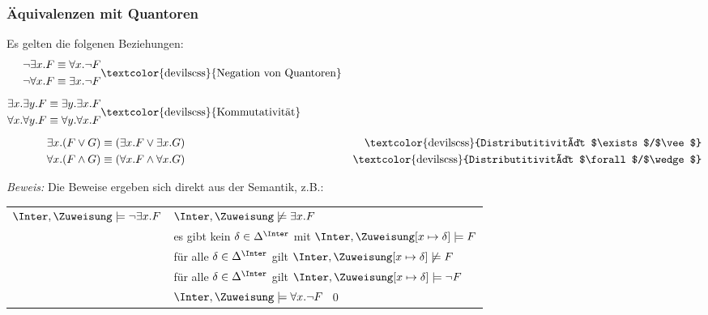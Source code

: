 \documentclass[aspectratio=1610,onlymath]{beamer}
\begin{document}
\begin{frame}\frametitle{Äquivalenzen mit Quantoren}

Es gelten die folgenen Beziehungen:
\begin{align*}
\begin{split}
\neg\exists x.F &\equiv \forall x.\neg F\\
\neg\forall x.F &\equiv \exists x.\neg F
\end{split}
& \text{\textcolor{devilscss}{Negation von Quantoren}}\\[1ex]
%
\begin{split}
\exists x.\exists y.F &\equiv \exists y.\exists x.F\\
\forall x.\forall y.F &\equiv \forall y.\forall x.F
\end{split}
& \text{\textcolor{devilscss}{Kommutativität}}\\[1ex]
%
\exists x.(F\vee G) &\equiv (\exists x.F\vee \exists x.G) & \text{\textcolor{devilscss}{Distributitivität $\exists$/$\vee$}}\\
\forall x.(F\wedge G) &\equiv (\forall x.F\wedge \forall x.G) & \text{\textcolor{devilscss}{Distributitivität $\forall$/$\wedge$}}
\end{align*}

\pause\emph{Beweis:} Die Beweise ergeben sich direkt aus der Semantik, z.B.:\bigskip

\begin{tabular}{r@{ gdw. }l}
$\Inter,\Zuweisung\models \neg\exists x.F$
& $\Inter,\Zuweisung\not\models \exists x.F$\pause\\[-0.9ex]
& es gibt kein $\delta\in\Delta^\Inter$ mit $\Inter,\Zuweisung[x\mapsto\delta]\models F$\pause\\[-0.9ex]
& für alle $\delta\in\Delta^\Inter$ gilt $\Inter,\Zuweisung[x\mapsto\delta]\not\models F$\pause\\[-0.9ex]
& für alle $\delta\in\Delta^\Inter$ gilt $\Inter,\Zuweisung[x\mapsto\delta]\models \neg F$\pause\\[-0.9ex]
& $\Inter,\Zuweisung\models \forall x.\neg F$\hspace{4cm}~\qed
\end{tabular}

\end{frame}
\end{document}
